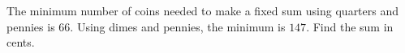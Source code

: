 The minimum number of coins needed to make a fixed sum using quarters and pennies is $66$. Using dimes and pennies, the minimum is $147$. Find the sum in cents.
